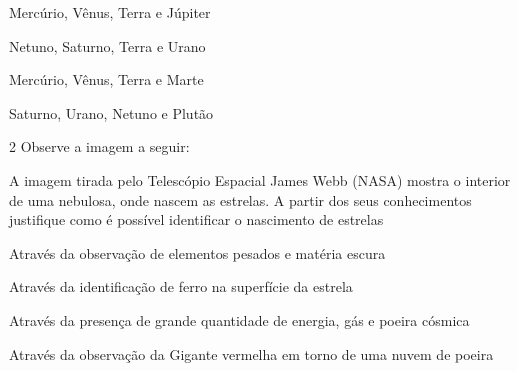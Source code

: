 \begin{escolha}
\item
  Mercúrio, Vênus, Terra e Júpiter
\item
  Netuno, Saturno, Terra e Urano
\item
  Mercúrio, Vênus, Terra e Marte
\item
  Saturno, Urano, Netuno e Plutão
\end{escolha}


\num{2} Observe a imagem a seguir:



A imagem tirada pelo Telescópio Espacial James Webb (NASA) mostra o
interior de uma nebulosa, onde nascem as estrelas. A partir dos seus
conhecimentos justifique como é possível identificar o nascimento de
estrelas

\begin{escolha}
\item
  Através da observação de elementos pesados e matéria escura
\item
  Através da identificação de ferro na superfície da estrela
\item
  Através da presença de grande quantidade de energia, gás e poeira
  cósmica
\item
  Através da observação da Gigante vermelha em torno de uma nuvem de
  poeira
\end{escolha}


